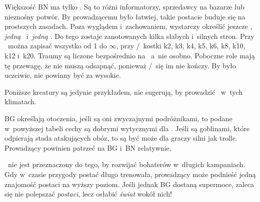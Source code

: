 {		Większość BN ma tylko . Są to różni informatorzy, sprzedawcy na bazarze lub nieznośny potwór. By prowadzącemu było łatwiej, takie postacie buduje się na prostszych zasadach. Poza wyglądem i~zachowaniem, wystarczy określić jeszcze \HD, \emph{jedną} \AD\ i~\emph{jedną} \RD. Do tego zostaje zanotowanych kilka słabych i~silnych stron. Przy \HD\ można zapisać wszystko od 1 do $\infty$, przy \AD/\RD\ kostki k2, k3, k4, k5, k6, k8, k10, k12 i~k20. Traumy są liczone bezpośrednio na \HD\ a~nie osobno. Poboczne role mają tę przewagę, że nie muszą odsapnąć, ponieważ \AD/\RD\ się im nie kończy. By było uczciwie, nie powinny być za wysokie.


		\noindent
		Poniższe kreatury są jedynie przykładem, nie sugerują, by prowadzić \nipajin\ w~tych klimatach.



		\noindent
		BG określają  otoczenia, jeśli są oni zwyczajnymi podróżnikami, to podane w~powyższej tabeli cechy są dobrymi wytycznymi dla . Jeśli są goblinami, które odpierają stada  atakujących obóz, to  są być może dla graczy silni jak trolle. Prowadzący powinien patrzeć na BG i~BN relatywnie.

		\nipajin\ nie jest przeznaczony do tego, by rozwijać bohaterów w~długich kampaniach. Gdy w~czasie przygody postać długo trenowała, prowadzący może podnieść jedną znajomość postaci na wyższy poziom. Jeśli jednak BG dostaną supermoce, zaleca się nie polepszać \emph{postaci}, lecz osłabić \emph{świat} wokół nich!
}
